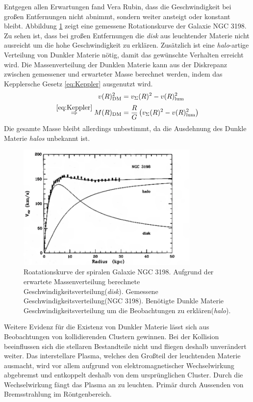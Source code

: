 Entgegen allen Erwartungen fand Vera Rubin, dass die Geschwindigkeit bei großen Entfernungen nicht abnimmt, sondern weiter ansteigt oder konstant bleibt.
Abbildung \ref{fig:ROT_NGC3198} zeigt eine gemessene Rotationskurve der Galaxie NGC 3198.
Zu sehen ist, dass bei großen Entfernungen die \textit{disk} aus leuchtender Materie nicht ausreicht um die hohe Geschwindigkeit zu erklären.
Zusätzlich ist eine \textit{halo}-artige Verteilung von Dunkler Materie nötig, damit das gewünschte Verhalten erreicht wird.
Die Massenverteilung der Dunklen Materie kann aus der Diskrepanz zwischen gemessener und erwarteter Masse berechnet werden, indem das Kepplersche Gesetz \eqref{eq:Keppler} ausgenutzt wird.
\begin{align}
v(R)_{\mathrm{DM}}^2 &= v_{\Sigma}(R)^2 - v(R)_{\mathrm{lum}}^2 \\
\stackrel{\eqref{eq:Keppler}}{\Rightarrow} M(R)_{\mathrm{DM}} &= \frac{R}{G}\left(v_{\Sigma}(R)^2 - v(R)_{\mathrm{lum}}^2\right)
\end{align}
Die gesamte Masse bleibt allerdings unbestimmt, da die Ausdehnung des Dunkle Materie \textit{halos} unbekannt ist.\cite{VRubin}

\begin{figure}[!t]
\begin{center}
\includegraphics[width=0.8\textwidth]{./fig/NGC3198.pdf}
\end{center}
\caption{Roatationskurve der spiralen Galaxie NGC 3198.
Aufgrund der erwartete Massenverteilung berechnete Geschwindigkeitsverteilung(\textit{disk}).
Gemessene Geschwindigkeitsverteilung(NGC 3198).
Benötigte Dunkle Materie Geschwindigkeitsverteilung um die Beobachtungen zu erklären(\textit{halo}).\cite{NGC}}
\label{fig:ROT_NGC3198}
\end{figure}

Weitere Evidenz für die Existenz von Dunkler Materie lässt sich aus Beobachtungen von kollidierenden Clustern gewinnen.
Bei der Kollision beeinflussen sich die stellaren Bestandteile nicht und fliegen deshalb unverändert weiter.
Das interstellare Plasma, welches den Großteil der leuchtenden Materie ausmacht, wird vor allem aufgrund von elektromagnetischer Wechselwirkung abgebremst und entkoppelt deshalb von dem ursprünglichen Cluster.
Durch die Wechselwirkung fängt das Plasma an zu leuchten.
Primär durch Aussenden von Bremsstrahlung im Röntgenbereich.

